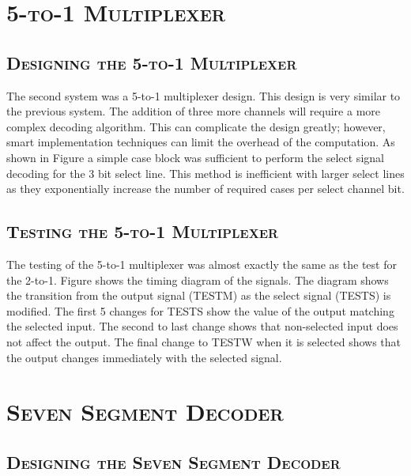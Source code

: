 \documentclass[11pt]{report}
\begin{document}
\begin{spacing}{1.5}
\section{\scshape 5-to-1 Multiplexer} %
\label{sec:5to1}

\subsection{\scshape Designing the 5-to-1 Multiplexer} %
\label{sub:design_5to1}

The second system was a 5-to-1 multiplexer design.  This design is very similar to the previous system.  The addition of three more channels will require a more complex decoding algorithm.  This can complicate the design greatly; however, smart implementation techniques can limit the overhead of the computation.  As shown in Figure a simple case block was sufficient to perform the select signal decoding for the 3 bit select line.  This method is inefficient with larger select lines as they exponentially increase the number of required cases per select channel bit.

\subsection{\scshape Testing the 5-to-1 Multiplexer} %
\label{sub:test_5to1}

The testing of the 5-to-1 multiplexer was almost exactly the same as the test for the 2-to-1.  Figure shows the timing diagram of the signals.  The diagram shows the transition from the output signal (TESTM) as the select signal (TESTS) is modified.  The first 5 changes for TESTS show the value of the output matching the selected input.  The second to last change shows that non-selected input does not affect the output.  The final change to TESTW when it is selected shows that the output changes immediately with the selected signal.


\section{\scshape Seven Segment Decoder}
\label{sec:seven_segment_decoder}

\subsection{\scshape Designing the Seven Segment Decoder} %
\label{sub:design_ssd}



\end{spacing}
\end{document}
